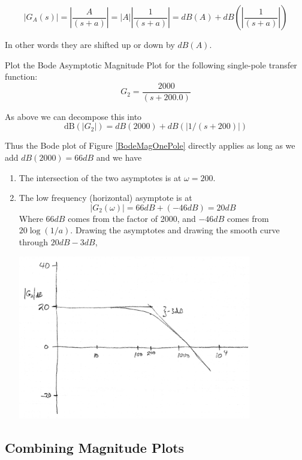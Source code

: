 \[
|G_A(s) | = \left | \frac {A} {(s+a)} \right | =  |A|  \left | \frac {1} {(s+a)} \right | = dB(A) + dB \left ( \left | \frac {1} {(s+a)} \right | \right)
\]

In other words they are shifted up or down by $dB(A)$.




\begin{ExampleSmall}
Plot the Bode Asymptotic Magnitude Plot for the following single-pole transfer function:
\[
G_2 = \frac  {2000} {(s + 200.0)}
\]

As above we can decompose this into
\[
\mathrm{dB}(|G_2|)  = dB(2000) + dB(|1/(s+200)|)
\]

Thus the Bode plot of Figure \ref{BodeMagOnePole} directly applies as long as we add $dB(2000) = 66dB$ and we have


\begin{enumerate}
  \item The intersection of the two asymptotes is at $\omega=200$.
  \item The low frequency (horizontal) asymptote is at
  \[
   |G_2(\omega)| = 66dB + (-46dB) = 20dB
  \]
  Where $66dB$ comes from the factor of 2000, and $-46dB$ comes from $20\log(1/a)$.    Drawing the asymptotes and drawing the smooth curve through $20dB - 3dB$,

  \includegraphics[width=4.0in]{figs05/00736a.png}
\end{enumerate}




\end{ExampleSmall}



\subsection{Combining Magnitude Plots}

